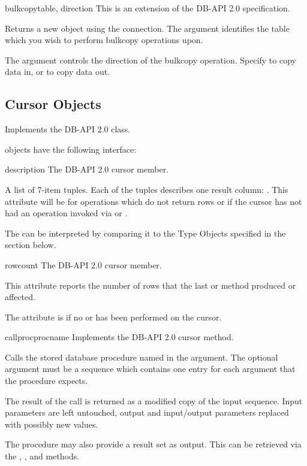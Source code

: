 \begin{methoddesc}[Connection]{bulkcopy}{table, direction}
This is an extension of the DB-API 2.0 specification.

Returns a new  object using the connection.  The
 argument identifies the table which you wish to perform
bulkcopy operations upon.

The  argument controls the direction of the bulkcopy
operation.  Specify  to copy data in, or
 to copy data out.
\end{methoddesc}

\subsection{Cursor Objects}

Implements the DB-API 2.0  class.

 objects have the following interface:

\begin{memberdesc}[Cursor]{description}
The DB-API 2.0 cursor  member.

A list of 7-item tuples.  Each of the tuples describes one result
column: .  This attribute will be  for
operations which do not return rows or if the cursor has not had an
operation invoked via  or .

The  can be interpreted by comparing it to the Type
Objects specified in the section below.
\end{memberdesc}

\begin{memberdesc}[Cursor]{rowcount}
The DB-API 2.0 cursor  member.

This attribute reports the number of rows that the last
 or  method produced or
affected.

The attribute is  if no  or
 has been performed on the cursor.
\end{memberdesc}

\begin{methoddesc}[Cursor]{callproc}{procname }
Implements the DB-API 2.0 cursor  method.

Calls the stored database procedure named in the 
argument. The optional  argument must be a sequence
which contains one entry for each argument that the procedure expects.

The result of the call is returned as a modified copy of the input
sequence.  Input parameters are left untouched, output and
input/output parameters replaced with possibly new values.

The procedure may also provide a result set as output. This can be
retrieved via the , , and
 methods.
\end{methoddesc}

